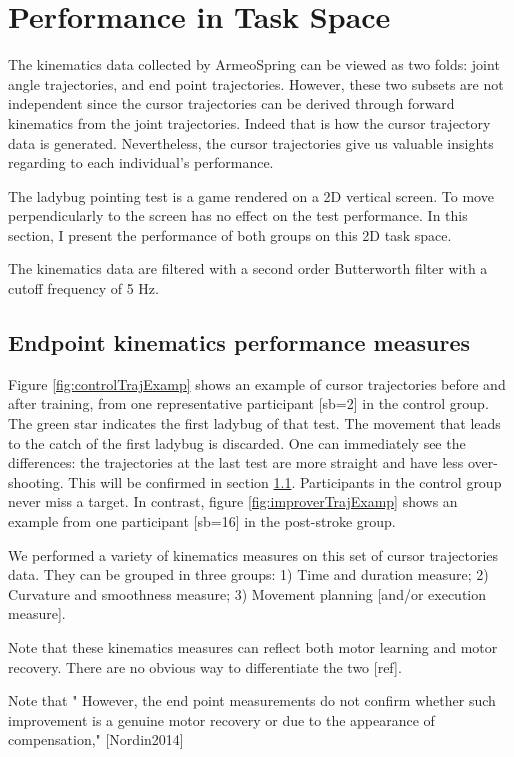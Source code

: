 \section{Performance in Task Space}

The kinematics data collected by ArmeoSpring can be viewed as two folds: joint angle trajectories, and end point trajectories. 
However, these two subsets are not independent since the cursor trajectories can be derived through forward kinematics from the joint trajectories. 
Indeed that is how the cursor trajectory data is generated. 
Nevertheless, the cursor trajectories give us valuable insights regarding to each individual's performance.

The ladybug pointing test is a game rendered on a 2D vertical screen. 
To move perpendicularly to the screen has no effect on the test performance. 
In this section, I present the performance of both groups on this 2D task space.

The kinematics data are filtered with a second order Butterworth filter with a cutoff frequency of 5 Hz.

\subsection{Endpoint kinematics performance measures}

Figure \ref{fig:controlTrajExamp} shows an example of cursor trajectories before and after training, from one representative participant [sb=2] in the control group. 
The green star indicates the first ladybug of that test. 
The movement that leads to the catch of the first ladybug is discarded. 
One can immediately see the differences: the trajectories at the last test are more straight and have less over-shooting. 
This will be confirmed in section \ref{}. 
Participants in the control group never miss a target.
In contrast, figure \ref{fig:improverTrajExamp} shows an example from one participant [sb=16] in the post-stroke group. 

We performed a variety of kinematics measures on this set of cursor trajectories data. 
They can be grouped in three groups: 1) Time and duration measure; 2) Curvature and smoothness measure; 3) Movement planning [and/or execution measure]. 

Note that these kinematics measures can reflect both motor learning and motor recovery. There are no obvious way to differentiate the two [ref].

Note that "
However, the end point measurements do not confirm whether such improvement is a genuine motor recovery or due to the appearance of compensation," [Nordin2014]



